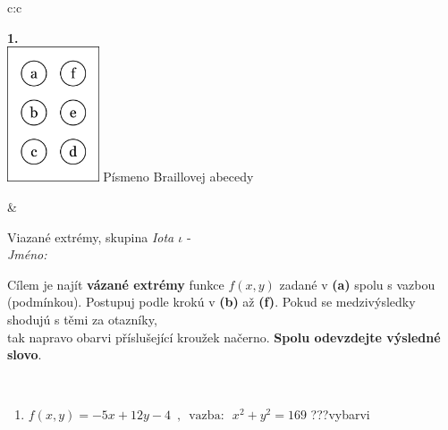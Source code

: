 \documentclass[10pt]{report}
\begin{document}
\begin{tabular}{c:c}
\begin{minipage}[c][104.5mm][t]{0.5\linewidth}
\begin{center}
\begin{minipage}{0.79\linewidth}
\begin{center}
\begin{varwidth}{\linewidth}
\begin{enumerate}
\end{enumerate}
\end{varwidth}
\end{center}
\end{minipage}
\begin{minipage}{0.20\linewidth}
\begin{center}
{\Huge\bfseries 1.} \\[2mm]
\includegraphics[height=40mm]{../images/braille.png}
{\small Písmeno Braillovej abecedy}
\end{center}
\end{minipage}
\end{center}
\end{minipage}
&
\begin{minipage}[c][104.5mm][t]{0.5\linewidth}
\begin{center}
\vspace{7mm}
{\huge Viazané extrémy, skupina \textit{Iota $\iota$} -}\\[5mm]
\textit{Jméno:}\phantom{xxxxxxxxxxxxxxxxxxxxxxxxxxxxxxxxxxxxxxxxxxxxxxxxxxxxxxxxxxxxxxxxx}\\[5mm]
\begin{minipage}{0.95\linewidth}
\begin{center}
Cílem je najít \textbf{vázané extrémy} funkce $f(x,y)$ zadané v \textbf{(a)} spolu s vazbou (podmínkou). Postupuj podle krokú v \textbf{(b)} až \textbf{(f)}. Pokud se medzivýsledky shodujú s těmi za otazníky,\\tak napravo obarvi příslušející kroužek načerno. \textbf{Spolu odevzdejte výsledné slovo}.
\end{center}
\end{minipage}
\\[1mm]
\begin{minipage}{0.79\linewidth}
\begin{center}
\begin{varwidth}{\linewidth}
\begin{enumerate}
\normalsize
\item $f(x,y)=-5x+12y-4 \enspace , \enspace \mathrm{vazba:} \enspace x^2+y^2=169$\quad \dotfill\; ???\;\dotfill \quad vybarvi

\end{enumerate}
\end{varwidth}
\end{center}
\end{minipage}
\end{center}
\end{minipage}
\end{tabular}
\end{document}
